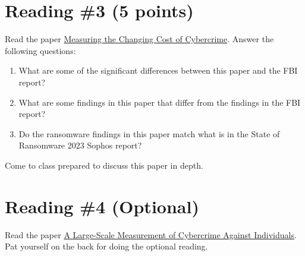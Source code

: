 \documentclass[11pt]{article}
\begin{document}
\section*{Reading \#3 (5 points)}

Read the paper \href{https://orca.cardiff.ac.uk/id/eprint/122684/}{Measuring the Changing Cost of Cybercrime}.
Answer the following questions:
\begin{enumerate}
    \item What are some of the significant differences between this paper and the FBI report?
    \item What are some findings in this paper that differ from the findings in the FBI report? 
    \item Do the ransomware findings in this paper match what is in the State of Ransomware 2023 Sophos report?
\end{enumerate}

Come to class prepared to discuss this paper in depth.

\section*{Reading \#4 (Optional)}

Read the paper \href{https://dl.acm.org/doi/abs/10.1145/3491102.3517613}{A Large-Scale Measurement of Cybercrime Against Individuals}. Pat yourself on the back for doing the optional reading.
\end{document}
